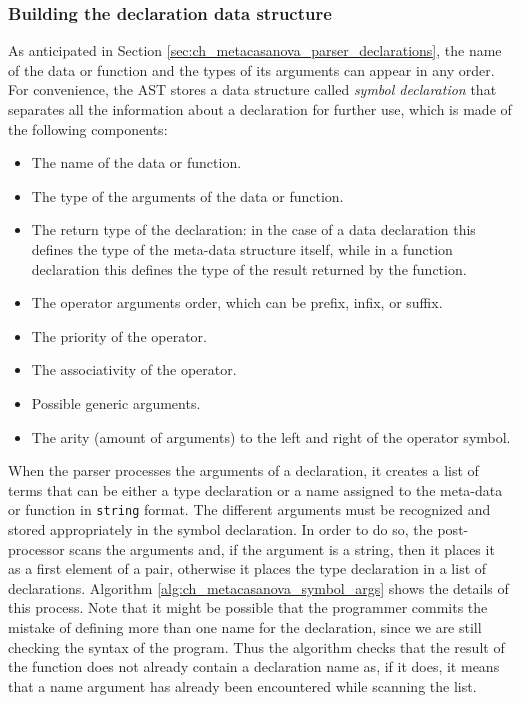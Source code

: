 \subsubsection{Building the declaration data structure}
As anticipated in Section \ref{sec:ch_metacasanova_parser_declarations}, the name of the data or function and the types of its arguments can appear in any order. For convenience, the AST stores a data structure called \textit{symbol declaration} that separates all the information about a declaration for further use, which is made of the following components:

\begin{itemize}[noitemsep]
	\item The name of the data or function.
	\item The type of the arguments of the data or function.
	\item The return type of the declaration: in the case of a data declaration this defines the type of the meta-data structure itself, while in a function declaration this defines the type of the result returned by the function.
	\item The operator arguments order, which can be prefix, infix, or suffix.
	\item The priority of the operator.
	\item The associativity of the operator.
	\item Possible generic arguments.
	\item The arity (amount of arguments) to the left and right of the operator symbol.
\end{itemize}

When the parser processes the arguments of a declaration, it creates a list of terms that can be either a type declaration or a name assigned to the meta-data or function in \texttt{string} format. The different arguments must be recognized and stored appropriately in the symbol declaration. In order to do so, the post-processor scans the arguments and, if the argument is a string, then it places it as a first element of a pair, otherwise it places the type declaration in a list of declarations. Algorithm \ref{alg:ch_metacasanova_symbol_args} shows the details of this process. Note that it might be possible that the programmer commits the mistake of defining more than one name for the declaration, since we are still checking the syntax of the program. Thus the algorithm checks that the result of the function does not already contain a declaration name as, if it does, it means that a name argument has already been encountered while scanning the list.

